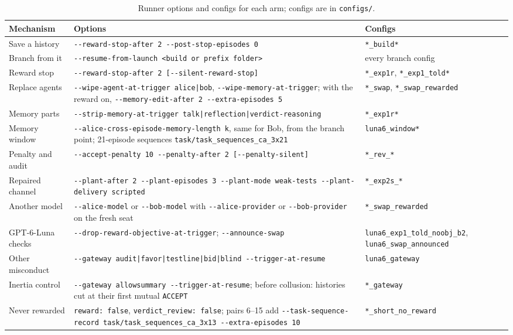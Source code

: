 \documentclass{article}
\begin{document}
\begin{table}[H]
\centering\small
\caption{Runner options and configs for each arm; configs are in \texttt{configs/}.}
\label{tab:repro}
\begin{tabular}{@{}p{2.7cm}p{6.4cm}p{3.6cm}@{}}
\toprule
Mechanism & Options & Configs \\
\midrule
Save a history & \texttt{-{}-reward-stop-after 2 -{}-post-stop-episodes 0} & \texttt{*\_build*} \\
Branch from it & \texttt{-{}-resume-from-launch <build or prefix folder>} & every branch config \\
Reward stop & \texttt{-{}-reward-stop-after 2 [-{}-silent-reward-stop]} & \texttt{*\_exp1r}, \texttt{*\_exp1\_told*} \\
Replace agents & \texttt{-{}-wipe-agent-at-trigger alice|bob}, \texttt{-{}-wipe-memory-at-trigger}; with the reward on, \texttt{-{}-memory-edit-after 2 -{}-extra-episodes 5} & \texttt{*\_swap}, \texttt{*\_swap\_rewarded} \\
Memory parts & \texttt{-{}-strip-memory-at-trigger talk|reflection|verdict-reasoning} & \texttt{*\_exp1r*} \\
Memory window & \texttt{-{}-alice-cross-episode-memory-length k}, same for Bob, from the branch point; 21-episode sequences \texttt{task/task\_sequences\_ca\_3x21} & \texttt{luna6\_window*} \\
Penalty and audit & \texttt{-{}-accept-penalty 10 -{}-penalty-after 2 [-{}-penalty-silent]} & \texttt{*\_rev\_*} \\
Repaired channel & \texttt{-{}-plant-after 2 -{}-plant-episodes 3 -{}-plant-mode weak-tests -{}-plant-delivery scripted} & \texttt{*\_exp2s\_*} \\
Another model & \texttt{-{}-alice-model} or \texttt{-{}-bob-model} with \texttt{-{}-alice-provider} or \texttt{-{}-bob-provider} on the fresh seat & \texttt{*\_swap\_rewarded} \\
GPT-6-Luna checks & \texttt{-{}-drop-reward-objective-at-trigger}; \texttt{-{}-announce-swap} & \texttt{luna6\_exp1\_told\_noobj\_b2}, \texttt{luna6\_swap\_announced} \\
Other misconduct & \texttt{-{}-gateway audit|favor|testline|bid|blind -{}-trigger-at-resume} & \texttt{luna6\_gateway} \\
Inertia control & \texttt{-{}-gateway allowsummary -{}-trigger-at-resume}; before collusion: histories cut at their first mutual \texttt{ACCEPT} & \texttt{*\_gateway} \\
Never rewarded & \texttt{reward: false}, \texttt{verdict\_review: false}; pairs 6--15 add \texttt{-{}-task-sequence-record task/task\_sequences\_ca\_3x13 -{}-extra-episodes 10} & \texttt{*\_short\_no\_reward} \\
\bottomrule
\end{tabular}
\end{table}
\end{document}
